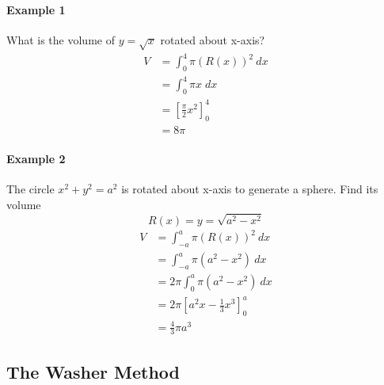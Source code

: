 \documentclass[12pt]{article}
\begin{document}
\paragraph{Example 1} What is the volume of $y = \sqrt{x}$ rotated about x-axis?
\begin{align*} 
    V &= \int_0^4 \pi (R(x))^2\: dx \\
    &= \int_0^4 \pi x\; dx \\
    &= \left[\frac{\pi}{2} x^2\right]^4_0 \\
    &= 8 \pi
\end{align*}

\paragraph{Example 2} The circle $x^2 + y^2 = a^2$ is rotated about x-axis to generate a sphere. Find its volume
\[
    R(x) = y = \sqrt{a^2 - x^2}
\]
\begin{align*} 
     V &= \int_{ - a}^{a} \pi (R(x))^2\: dx \\
     &= \int_{ - a}^a \pi (a^2 - x^2)\: dx \\
     &= 2\pi \int_{0}^a \pi (a^2 - x^2)\: dx \\
     &= 2\pi \left[a^2 x - \frac{1}{3}x^3 \right]_0^a \\
     &= \frac{4}{3}\pi a^3
\end{align*}

\subsection{The Washer Method}
\end{document}
